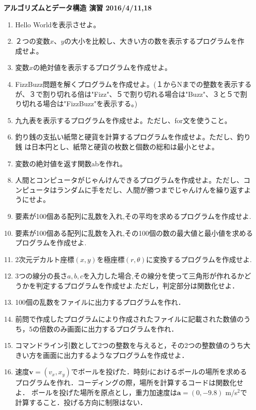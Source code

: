 \documentclass[a4j, 11pt, fleqn]{jsarticle}
\begin{document}
{\LARGE \bf アルゴリズムとデータ構造 演習 2016/4/11,18}

\begin{enumerate}

  \item Hello Worldを表示させよ。
    \item ２つの変数$x$、$y$の大小を比較し、大きい方の数を表示するプログラムを作
          成せよ。
    \item 変数$x$の絶対値を表示するプログラムを作成せよ。
    \item FizzBuzz問題を解くプログラムを作成せよ。(１からNまでの整数を表示するが、３で割り切れる倍は"Fizz"、５で割り切れる場合は"Buzz"、３と５で割り切れる場合は"FizzBuzz"を表示する。)
    \item 九九表を表示するプログラムを作成せよ。ただし、for文を使うこと。
    \item 釣り銭の支払い紙幣と硬貨を計算するプログラムを作成せよ。ただし、釣り銭
          は日本円とし、紙幣と硬貨の枚数と個数の総和は最小とせよ。
    \item 変数の絶対値を返す関数abを作れ。
    \item 人間とコンピュータがじゃんけんできるプログラムを作成せよ。ただし、コンピュータはランダムに手をだし、人間が勝つまでじゃんけんを繰り返すようにせよ。
    \item 要素が100個ある配列に乱数を入れ,その平均を求めるプログラムを作成せよ.
    \item 要素が100個ある配列に乱数を入れ,その100個の数の最大値と最小値を求めるプログラムを作成せよ.
    \item 2次元デカルト座標$(x, y)$を極座標$(r, \theta)$に変換するプログラムを作成せよ.
    \item 3つの線分の長さ$a, b, c$を入力した場合,その線分を使って三角形が作れるかどうかを判定するプログラムを作成せよ.ただし，判定部分は関数化せよ．
    \item 100個の乱数をファイルに出力するプログラムを作れ．
    \item 前問で作成したプログラムにより作成されたファイルに記載された数値のうち，5の倍数のみ画面に出力するプログラムを作れ．
    \item コマンドライン引数として2つの整数を与えると，その2つの整数値のうち大きい方を画面に出力するようなプログラムを作成せよ．
    \item 速度$\bm v = (v_x, x_y)$でボールを投げた．時刻$t$におけるボールの場所を求めるプログラムを作れ．コーディングの際，場所を計算するコードは関数化せよ．
    ボールを投げた場所を原点とし，重力加速度は$\bm a = (0, -9.8)$ m/s$^2$で計算すること．投げる方向に制限はない．

\end{enumerate}
\end{document}
